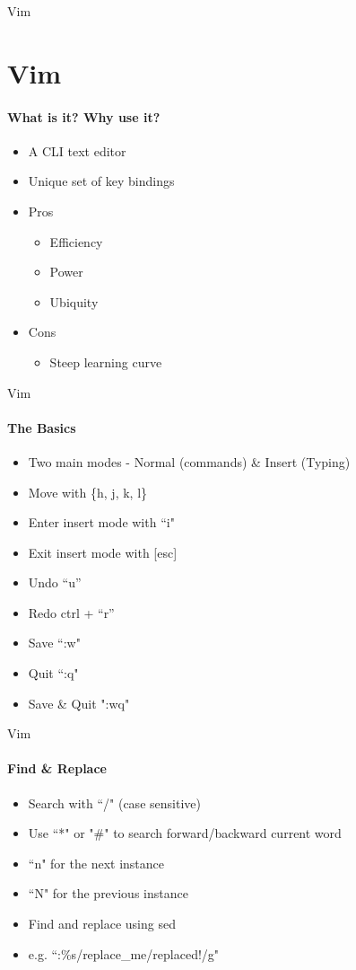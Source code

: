 \documentclass{beamer}
\begin{document}
\begin{frame}{Vim}
  \section{Vim}
  \framesubtitle{What is it? Why use it?}

  \begin{itemize}\setlength\itemsep{1em}
    \item A CLI text editor
    \item Unique set of key bindings
    \item Pros
      \begin{itemize}
        \item Efficiency
        \item Power
        \item Ubiquity
      \end{itemize}
    \item Cons
      \begin{itemize}
        \item Steep learning curve
      \end{itemize}
  \end{itemize}

  \framebreak

\end{frame}


\begin{frame}{Vim}
  \framesubtitle{The Basics}

  \begin{itemize}\setlength\itemsep{1em}
    \item Two main modes - Normal (commands) \& Insert (Typing)
    \item Move with \{h, j, k, l\}
    \item Enter insert mode with ``i"
    \item Exit insert mode with [esc]
    \item Undo ``u''
    \item Redo ctrl + ``r''
    \item Save ``:w"
    \item Quit ``:q"
    \item Save \& Quit ":wq"
  \end{itemize}

\end{frame}

\begin{frame}{Vim}
  \framesubtitle{Find \& Replace}

  \begin{itemize}\setlength\itemsep{1em}
    \item Search with ``/" (case sensitive)
    \item Use ``*" or "\#" to search forward/backward current word
    \item ``n" for the next instance
    \item ``N" for the previous instance
    \item Find and replace using sed
    \item e.g. ``:\%s/replace\_me/replaced!/g"
  \end{itemize}

\end{frame}
\end{document}
